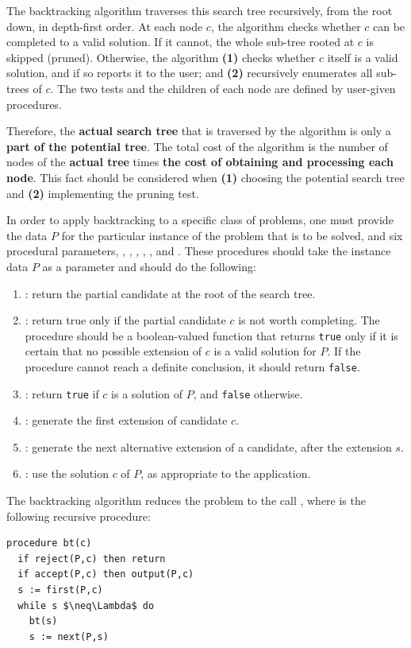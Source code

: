 The backtracking algorithm traverses this search tree recursively, from the
root down, in depth-first order. At each node $c$, the algorithm checks
whether $c$ can be completed to a valid solution. If it cannot, the whole
sub-tree rooted at $c$ is skipped (pruned). Otherwise, the algorithm
\textbf{(1)} checks whether $c$ itself is a valid solution, and if so
reports it to the user; and \textbf{(2)} recursively enumerates all
sub-trees of $c$. The two tests and the children of each node are defined by
user-given procedures.

Therefore, the \textbf{actual search tree} that is traversed by the
algorithm is only a \textbf{part of the potential tree}. The total cost of
the algorithm is the number of nodes of the \textbf{actual tree} times
\textbf{the cost of obtaining and processing each node}. This fact should be
considered when \textbf{(1)} choosing the potential search tree and
\textbf{(2)} implementing the pruning test.


In order to apply backtracking to a specific class of problems, one must
provide the data $P$ for the particular instance of the problem that is to
be solved, and six procedural parameters, , ,
, , , and . These procedures
should take the instance data $P$ as a parameter and should do the
following:
\begin{enumerate}[label=\textbf{\arabic*.}]
\item {}: return the partial candidate at the root of the search
  tree.
\item {}: return true only if the partial candidate $c$ is
  not worth completing. The  procedure should be a
  boolean-valued function that returns \texttt{true} only if it is certain
  that no possible extension of $c$ is a valid solution for $P$. If the
  procedure cannot reach a definite conclusion, it should return
  \texttt{false}.
\item {}: return \texttt{true} if $c$ is a solution of $P$,
  and \texttt{false} otherwise.
\item {}: generate the first extension of candidate $c$.
\item {}: generate the next alternative extension of a
  candidate, after the extension $s$.
\item {}: use the solution $c$ of $P$, as appropriate to the
  application.
\end{enumerate}
The backtracking algorithm reduces the problem to the call
, where  is the following recursive procedure:
\begin{lstlisting}[style=pseudostyle,numbers=none]
procedure bt(c)
  if reject(P,c) then return
  if accept(P,c) then output(P,c)
  s := first(P,c)
  while s $\neq\Lambda$ do
    bt(s)
    s := next(P,s)
\end{lstlisting}

